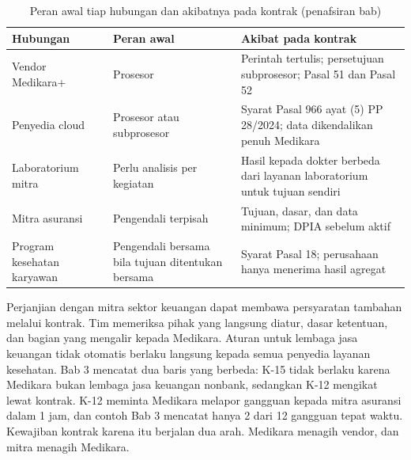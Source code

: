 \begin{table}[!htb]
  \centering\small
  \caption{Peran awal tiap hubungan dan akibatnya pada kontrak (penafsiran bab)}
  \label{tab:ch09-peran}
  \begin{tabularx}{\textwidth}{|>{\raggedright\arraybackslash}p{}|>{\raggedright\arraybackslash}p{}|>{\raggedright\arraybackslash}X|}
    \hline
    \textbf{Hubungan} & \textbf{Peran awal} & \textbf{Akibat pada kontrak} \\ \hline
    Vendor Medikara+ & Prosesor & Perintah tertulis; persetujuan subprosesor; Pasal 51 dan Pasal 52
    \\ \hline
    Penyedia cloud & Prosesor atau subprosesor & Syarat Pasal 966 ayat (5) PP 28/2024; data
    dikendalikan penuh Medikara \\ \hline
    Laboratorium mitra & Perlu analisis per kegiatan & Hasil kepada dokter berbeda dari layanan
    laboratorium untuk tujuan sendiri \\ \hline
    Mitra asuransi & Pengendali terpisah & Tujuan, dasar, dan data minimum; DPIA sebelum aktif \\
    \hline
    Program kesehatan karyawan & Pengendali bersama bila tujuan ditentukan bersama & Syarat Pasal
    18; perusahaan hanya menerima hasil agregat \\ \hline
  \end{tabularx}
\end{table}

Perjanjian dengan mitra sektor keuangan dapat membawa persyaratan tambahan melalui kontrak. Tim
memeriksa pihak yang langsung diatur, dasar ketentuan, dan bagian yang mengalir kepada Medikara.
Aturan untuk lembaga jasa keuangan tidak otomatis berlaku langsung kepada semua penyedia layanan
kesehatan. Bab 3 mencatat dua baris yang berbeda: K-15 tidak berlaku karena Medikara bukan lembaga
jasa keuangan nonbank, sedangkan K-12 mengikat lewat kontrak. K-12 meminta Medikara melapor gangguan
kepada mitra asuransi dalam 1 jam, dan contoh Bab 3 mencatat hanya 2 dari 12 gangguan tepat waktu.
Kewajiban kontrak karena itu berjalan dua arah. Medikara menagih vendor, dan mitra menagih Medikara.

